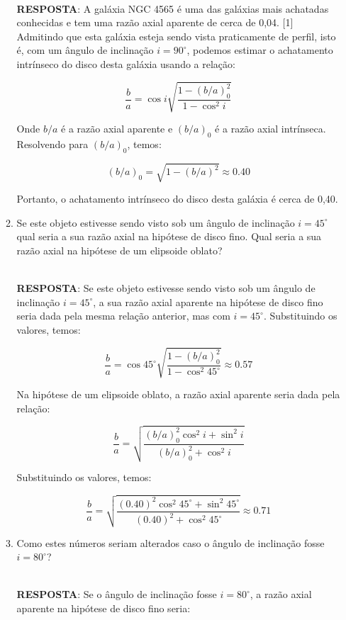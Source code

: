 \documentclass[a4paper,12pt]{article}
\begin{document}
\begin{enumerate}
\begin{enumerate}
\noindent\hrulefill\\\textbf{RESPOSTA}: A galáxia NGC 4565 é uma das galáxias mais achatadas conhecidas e tem uma razão axial aparente de cerca de 0,04. [1] Admitindo que esta galáxia esteja sendo vista praticamente de perfil, isto é, com um ângulo de inclinação $i=90^\circ$, podemos estimar o achatamento intrínseco do disco desta galáxia usando a relação:

$$
\frac{b}{a} = \cos i \sqrt{\frac{1 - (b/a)_0^2}{1 - \cos^2 i}}
$$

Onde $b/a$ é a razão axial aparente e $(b/a)_0$ é a razão axial intrínseca. Resolvendo para $(b/a)_0$, temos:

$$
(b/a)_0 = \sqrt{1 - (b/a)^2} \approx 0.40
$$

Portanto, o achatamento intrínseco do disco desta galáxia é cerca de 0,40.

\noindent\hrulefill

\item Se este objeto estivesse sendo visto sob um ângulo de inclinação $i=45^\circ$ qual seria a sua razão axial na hipótese de disco fino. Qual seria a sua razão axial na hipótese de um elipsoide oblato? 

\noindent\hrulefill\\\textbf{RESPOSTA}: Se este objeto estivesse sendo visto sob um ângulo de inclinação $i=45^\circ$, a sua razão axial aparente na hipótese de disco fino seria dada pela mesma relação anterior, mas com $i=45^\circ$. Substituindo os valores, temos:

$$
\frac{b}{a} = \cos 45^\circ \sqrt{\frac{1 - (b/a)_0^2}{1 - \cos^2 45^\circ}} \approx 0.57
$$

Na hipótese de um elipsoide oblato, a razão axial aparente seria dada pela relação:

$$
\frac{b}{a} = \sqrt{\frac{(b/a)_0^2 \cos^2 i + \sin^2 i}{(b/a)_0^2 + \cos^2 i}}
$$

Substituindo os valores, temos:

$$
\frac{b}{a} = \sqrt{\frac{(0.40)^2 \cos^2 45^\circ + \sin^2 45^\circ}{(0.40)^2 + \cos^2 45^\circ}} \approx 0.71
$$

\noindent\hrulefill

\item Como estes números seriam alterados caso o ângulo de inclinação fosse $i=80^\circ$? 

\noindent\hrulefill\\\textbf{RESPOSTA}: Se o ângulo de inclinação fosse $i=80^\circ$, a razão axial aparente na hipótese de disco fino seria:


\end{enumerate}
\end{enumerate}
\end{document}
